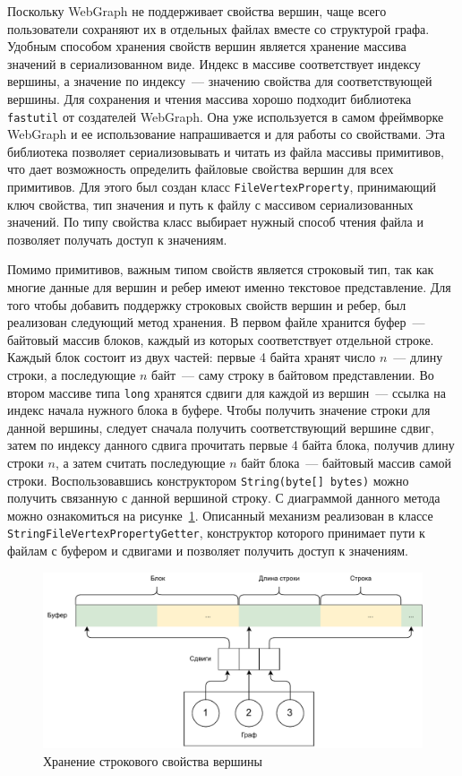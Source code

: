 \documentclass[times,specification,annotation]{itmo-student-thesis}
\begin{document}
Поскольку WebGraph не поддерживает свойства вершин, чаще всего пользователи сохраняют их в отдельных файлах вместе со структурой графа. Удобным способом хранения свойств вершин является хранение массива значений в сериализованном виде. Индекс в массиве соответствует индексу вершины, а значение по индексу~--- значению свойства для соответствующей вершины. Для сохранения и чтения массива хорошо подходит библиотека \texttt{fastutil} от создателей WebGraph. Она уже используется в самом фреймворке WebGraph и ее использование напрашивается и для работы со свойствами.
Эта библиотека позволяет сериализовывать и читать из файла массивы примитивов, что дает возможность определить файловые свойства вершин для всех примитивов. Для этого был создан класс \texttt{FileVertexProperty}, принимающий ключ свойства, тип значения и путь к файлу с массивом сериализованных значений. По типу свойства класс выбирает нужный способ чтения файла и позволяет получать доступ к значениям.

Помимо примитивов, важным типом свойств является строковый тип, так как многие данные для вершин и ребер имеют именно текстовое представление. Для того чтобы добавить поддержку строковых свойств вершин и ребер, был реализован следующий метод хранения. В первом файле хранится буфер~--- байтовый массив блоков, каждый из которых соответствует отдельной строке. Каждый блок состоит из двух частей: первые 4 байта хранят число $n$~--- длину строки, а последующие $n$ байт~--- саму строку в байтовом представлении. Во втором массиве типа \texttt{long} хранятся сдвиги для каждой из вершин~--- ссылка на индекс начала нужного блока в буфере. Чтобы получить значение строки для данной вершины, следует сначала получить соответствующий вершине сдвиг, затем по индексу данного сдвига прочитать первые 4 байта блока, получив длину строки $n$, а затем считать последующие $n$ байт блока~--- байтовый массив самой строки. Воспользовавшись конструктором \texttt{String(byte[] bytes)} можно получить связанную с данной вершиной строку. С диаграммой данного метода можно ознакомиться на рисунке~\ref{fig:blocks}. 
Описанный механизм реализован в классе \texttt{StringFileVertexPropertyGetter}, конструктор которого принимает пути к файлам с буфером и сдвигами и позволяет получить доступ к значениям.

\begin{figure}[!h]
\caption{Хранение строкового свойства вершины}\label{fig:blocks}
\centering
\includegraphics[width=\textwidth]{img/blocks.pdf}
\end{figure}
\end{document}
